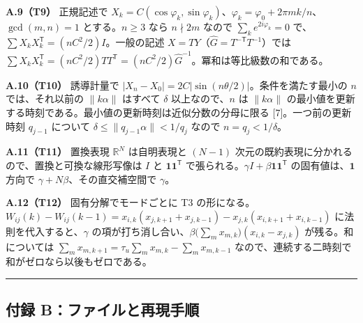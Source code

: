 \documentclass[
  a4paper,
]{ltjsarticle}
\begin{document}
\textbf{A.9（T9）} 正規記述で
\(X_k=C(\cos\varphi_k,\sin\varphi_k)\)、\(\varphi_k=\varphi_0+2\pi mk/n\)、\(\gcd(m,n)=1\)
とする。\(n\ge3\) なら \(n\nmid2m\) なので \(\sum_ke^{2i\varphi_k}=0\)
で、\(\sum X_kX_k^{\mathsf T}=(nC^2/2)I\)。一般の記述
\(X=TY\)（\(\hat G=T^{-\mathsf T}T^{-1}\)）では
\(\sum X_kX_k^{\mathsf T}=(nC^2/2)TT^{\mathsf T}=(nC^2/2)\hat G^{-1}\)。冪和は等比級数の和である。

\textbf{A.10（T10）} 誘導計量で
\(\lvert X_n-X_0\rvert=2C\lvert\sin(n\theta/2)\rvert\)。条件を満たす最小の
\(n\) では、それ以前の \(\|k\alpha\|\) はすべて \(\delta\)
以上なので、\(n\) は \(\|k\alpha\|\)
の最小値を更新する時刻である。最小値の更新時刻は近似分数の分母に限る
{[}7{]}。一つ前の更新時刻 \(q_{j-1}\) について
\(\delta\le\|q_{j-1}\alpha\|<1/q_j\) なので \(n=q_j<1/\delta\)。

\textbf{A.11（T11）} 置換表現 \(\mathbb R^N\) は自明表現と \((N-1)\)
次元の既約表現に分かれるので、置換と可換な線形写像は \(I\) と
\(\mathbf 1\mathbf 1^{\mathsf T}\)
で張られる。\(\gamma I+\beta\mathbf 1\mathbf 1^{\mathsf T}\)
の固有値は、\(\mathbf 1\) 方向で \(\gamma+N\beta\)、その直交補空間で
\(\gamma\)。

\textbf{A.12（T12）} 固有分解でモードごとに T3
の形になる。\(W_{ij}(k)-W_{ij}(k-1)=x_{i,k}(x_{j,k+1}+x_{j,k-1})-x_{j,k}(x_{i,k+1}+x_{i,k-1})\)
に法則を代入すると、\(\gamma\)
の項が打ち消し合い、\(\beta\bigl(\sum_mx_{m,k}\bigr)(x_{i,k}-x_{j,k})\)
が残る。和については
\(\sum_mx_{m,k+1}=\tau_u\sum_mx_{m,k}-\sum_mx_{m,k-1}\)
なので、連続する二時刻で和がゼロなら以後もゼロである。

\begin{center}\rule{0.5\linewidth}{0.5pt}\end{center}

\subsection{付録
B：ファイルと再現手順}\label{ux4ed8ux9332-bux30d5ux30a1ux30a4ux30ebux3068ux518dux73feux624bux9806}
\end{document}
